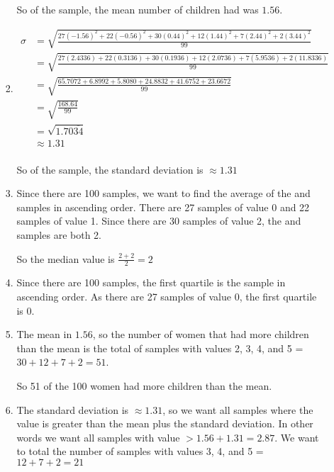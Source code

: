 \documentclass[12pt,letterpaper]{article}
\begin{document}
\begin{enumerate}
\begin{enumerate}
\begin{enumerate}[label=\arabic* )]
              So of the sample, the mean number of children had was $1.56$.

            \item
              \begin{align*}
                \sigma &= \sqrt{\frac{27(-1.56)^2 + 22(-0.56)^2 + 30(0.44)^2 + 12(1.44)^2 + 7(2.44)^2 + 2(3.44)^2}{99}} \\
                &=\sqrt{\frac{27(2.4336) + 22(0.3136) + 30(0.1936) + 12(2.0736) + 7(5.9536) + 2(11.8336)}{99}} \\
                &=\sqrt{\frac{65.7072 + 6.8992 + 5.8080 + 24.8832 + 41.6752 + 23.6672}{99}} \\
                &=\sqrt{\frac{168.64}{99}} \\
                &=\sqrt{1.70\overline{34}} \\
                &\approx 1.31 \\
              \end{align*}

              So of the sample, the standard deviation is $\approx 1.31$

            \item
              Since there are 100 samples,
              we want to find the average of the  and  samples in ascending order.
              There are 27 samples of value 0 and 22 samples of value 1.
              Since there are 30 samples of value 2,
              the  and  samples are both 2.

              So the median value is $\frac{2 + 2}{2} = 2$

            \item

              Since there are 100 samples,
              the first quartile is the  sample in ascending order.
              As there are 27 samples of value 0,
              the first quartile is 0.

            \item
              The mean in $1.56$,
              so the number of women that had more children than the mean
              is the total of samples with values 2, 3, 4, and 5 = $30 + 12 + 7 + 2 = 51$.

              So 51 of the 100 women had more children than the mean.

            \item
              The standard deviation is $\approx 1.31$,
              so we want all samples where the value is greater than the mean plus the standard deviation.
              In other words we want all samples with value $> 1.56 + 1.31 = 2.87$.
              We want to total the number of samples with values 3, 4, and 5 = $12 + 7 + 2 = 21$


\end{enumerate}
\end{enumerate}
\end{enumerate}
\end{document}
